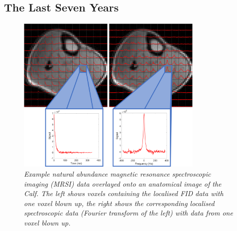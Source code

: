 \documentclass[class=article, crop=false]{standalone}
\begin{document}
\subsection{The Last Seven Years}

\begin{figure}[H]
    \centering
    \includegraphics[width=0.8\textwidth]{Figures/Intro/CSI.png}
    \caption{\textit{Example natural abundance magnetic resonance spectroscopic imaging (MRSI) data overlayed onto an anatomical image of the Calf. The left shows voxels containing the localised FID data with one voxel blown up, the right shows the corresponding localised spectroscopic data (Fourier transform of the left) with data from one voxel blown up.}}
    \label{fig:intro:CSI}
\end{figure}
\end{document}
